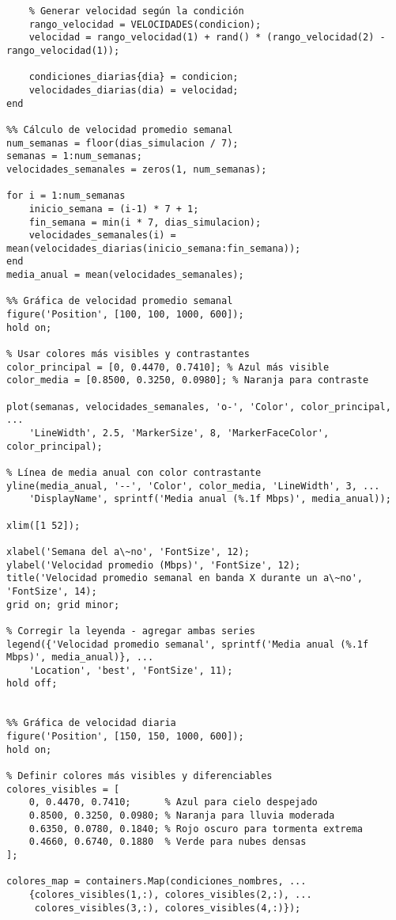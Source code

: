 \begin{verbatim}
    % Generar velocidad según la condición
    rango_velocidad = VELOCIDADES(condicion);
    velocidad = rango_velocidad(1) + rand() * (rango_velocidad(2) - rango_velocidad(1));
    
    condiciones_diarias{dia} = condicion;
    velocidades_diarias(dia) = velocidad;
end

%% Cálculo de velocidad promedio semanal
num_semanas = floor(dias_simulacion / 7);
semanas = 1:num_semanas;
velocidades_semanales = zeros(1, num_semanas);

for i = 1:num_semanas
    inicio_semana = (i-1) * 7 + 1;
    fin_semana = min(i * 7, dias_simulacion);
    velocidades_semanales(i) = mean(velocidades_diarias(inicio_semana:fin_semana));
end
media_anual = mean(velocidades_semanales);

%% Gráfica de velocidad promedio semanal
figure('Position', [100, 100, 1000, 600]);
hold on;

% Usar colores más visibles y contrastantes
color_principal = [0, 0.4470, 0.7410]; % Azul más visible
color_media = [0.8500, 0.3250, 0.0980]; % Naranja para contraste

plot(semanas, velocidades_semanales, 'o-', 'Color', color_principal, ...
    'LineWidth', 2.5, 'MarkerSize', 8, 'MarkerFaceColor', color_principal);

% Línea de media anual con color contrastante
yline(media_anual, '--', 'Color', color_media, 'LineWidth', 3, ...
    'DisplayName', sprintf('Media anual (%.1f Mbps)', media_anual));

xlim([1 52]);

xlabel('Semana del a\~no', 'FontSize', 12);
ylabel('Velocidad promedio (Mbps)', 'FontSize', 12);
title('Velocidad promedio semanal en banda X durante un a\~no', 'FontSize', 14);
grid on; grid minor;

% Corregir la leyenda - agregar ambas series
legend({'Velocidad promedio semanal', sprintf('Media anual (%.1f Mbps)', media_anual)}, ...
    'Location', 'best', 'FontSize', 11);
hold off;


%% Gráfica de velocidad diaria
figure('Position', [150, 150, 1000, 600]);
hold on;

% Definir colores más visibles y diferenciables
colores_visibles = [
    0, 0.4470, 0.7410;      % Azul para cielo despejado
    0.8500, 0.3250, 0.0980; % Naranja para lluvia moderada  
    0.6350, 0.0780, 0.1840; % Rojo oscuro para tormenta extrema
    0.4660, 0.6740, 0.1880  % Verde para nubes densas
];

colores_map = containers.Map(condiciones_nombres, ...
    {colores_visibles(1,:), colores_visibles(2,:), ...
     colores_visibles(3,:), colores_visibles(4,:)});


\end{verbatim}
